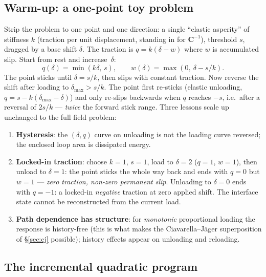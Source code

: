 \documentclass[11pt,a4paper]{article}
\newcommand{\bC}{\mathbf{C}}
\begin{document}
\subsection{Warm-up: a one-point toy problem}
\label{sec:toy1}

Strip the problem to one point and one direction: a single ``elastic
asperity'' of stiffness $k$ (traction per unit displacement, standing in for
$\bC^{-1}$), threshold $s$, dragged by a base shift $\delta$. The traction
is $q = k(\delta - w)$ where $w$ is accumulated slip. Start from rest and
increase~$\delta$:
\begin{equation}
  q(\delta) = \min(k\delta,\, s), \qquad
  w(\delta) = \max\!\left(0,\ \delta - s/k\right).
\end{equation}
The point sticks until $\delta = s/k$, then slips with constant traction.
Now reverse the shift after loading to $\delta_{\max} > s/k$. The point
first re-sticks (elastic unloading, $q = s - k(\delta_{\max}-\delta)$) and
only re-slips backwards when $q$ reaches $-s$, i.e.\ after a reversal of
$2s/k$ --- \emph{twice} the forward stick range. Three lessons scale up
unchanged to the full field problem:
\begin{enumerate}
\item \textbf{Hysteresis}: the $(\delta, q)$ curve on unloading is not the
  loading curve reversed; the enclosed loop area is dissipated energy.
\item \textbf{Locked-in traction}: choose $k = 1$, $s = 1$, load to
  $\delta = 2$ ($q = 1$, $w = 1$), then unload to $\delta = 1$: the point
  sticks the whole way back and ends with $q = 0$ but $w = 1$ ---
  \emph{zero traction, non-zero permanent slip}. Unloading to $\delta = 0$
  ends with $q = -1$: a locked-in \emph{negative} traction at zero applied
  shift. The interface state cannot be reconstructed from the current load.
\item \textbf{Path dependence has structure}: for \emph{monotonic}
  proportional loading the response is history-free (this is what makes the
  Ciavarella--J\"ager superposition of \S\ref{sec:cj} possible); history
  effects appear on unloading and reloading.
\end{enumerate}

\subsection{The incremental quadratic program}
\label{sec:qp}
\end{document}
